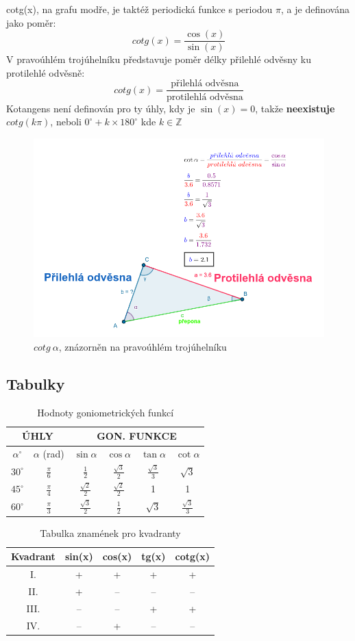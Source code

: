 cotg(x), na grafu modře, je taktéž periodická funkce s periodou $\pi$, a je definována jako poměr:
$$
    cotg(x) = \frac{\cos(x)}{\sin(x)}
$$
V pravoúhlém trojúhelníku představuje poměr délky přilehlé odvěsny ku protilehlé odvěsně:
$$
    cotg(x) = \frac{\text{přilehlá odvěsna}}{\text{protilehlá odvěsna}}
$$
Kotangens není definován pro ty úhly, kdy je $\sin(x) = 0$, takže \textbf{neexistuje} $cotg(k\pi)$, neboli $0^{\circ}+ k \times 180^{\circ}$ kde $k \in \mathbb{Z}$
\begin{figure}[h]
    \centering
    \includegraphics[width=0.5\linewidth]{img/7_TrojuhlenikAKotangens.png}
    \caption{$cotg\ \alpha$, znázorněn na pravoúhlém trojúhelníku}
    \label{fig:kotangens-na-pravouhlem-trojuhelniku}
\end{figure}
\subsection{Tabulky}
\begin{table}[h]
    \centering
    \begin{tabular}{|c|c|c|c|c|c|}
        \hline
        \multicolumn{2}{|c|}{\textbf{ÚHLY}} & \multicolumn{4}{c|}{\textbf{GON. FUNKCE}} \\ \hline
        $\alpha^\circ$ & $\alpha$ (rad) & $\sin \alpha$ & $\cos \alpha$ & $\tan \alpha$ & $\cot \alpha$ \\ \hline
        $30^\circ$ & $\frac{\pi}{6}$ & $\frac{1}{2}$ & $\frac{\sqrt{3}}{2}$ & $\frac{\sqrt{3}}{3}$ & $\sqrt{3}$ \\ \hline
        $45^\circ$ & $\frac{\pi}{4}$ & $\frac{\sqrt{2}}{2}$ & $\frac{\sqrt{2}}{2}$ & 1 & 1 \\ \hline
        $60^\circ$ & $\frac{\pi}{3}$ & $\frac{\sqrt{3}}{2}$ & $\frac{1}{2}$ & $\sqrt{3}$ & $\frac{\sqrt{3}}{3}$ \\ \hline
    \end{tabular}
    \caption{Hodnoty  goniometrických funkcí}
    \label{tab:Goniometricke_Funkce}
\end{table}

\begin{table}[h]
    \centering
    \begin{tabular}{|c|c|c|c|c|}
    \hline
    \textbf{Kvadrant} & sin(x) & cos(x) & tg(x) & cotg(x) \\ \hline
    I.  & + & + & + & + \\ \hline
    II. & + & -- & -- & -- \\ \hline
    III.& -- & -- & + & + \\ \hline
    IV. & -- & + & -- & -- \\ \hline
    \end{tabular}
    \caption{Tabulka znamének pro kvadranty}
    \label{tab:Znamenka_Goniometrie}
\end{table}
